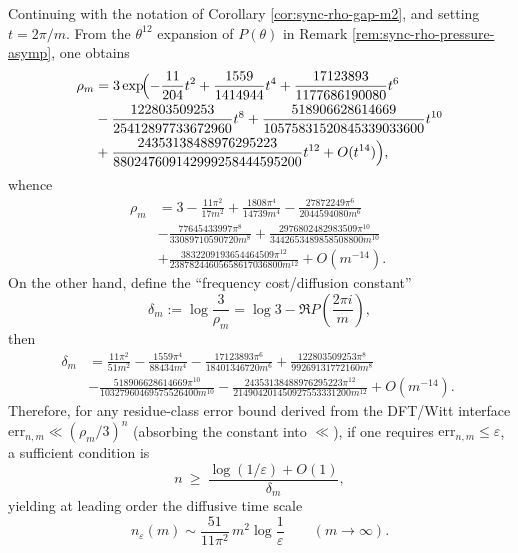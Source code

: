 \begin{corollary}\label{cor:sync-rho-gap-m8-diffusive}
Continuing with the notation of Corollary \ref{cor:sync-rho-gap-m2}, and setting \(t=2\pi/m\).
From the \(\theta^{12}\) expansion of \(P(\theta)\) in Remark \ref{rem:sync-rho-pressure-asymp}, one obtains
\[
\begin{aligned}
\rho_m
&=3\exp\!\Bigl(-\frac{11}{204}t^2+\frac{1559}{1414944}t^4+\frac{17123893}{1177686190080}t^6\\
&-\frac{122803509253}{25412897733672960}t^8+\frac{518906628614669}{10575831520845339033600}t^{10}\\
&+\frac{24353138488976295223}{880247609142999258444595200}t^{12}+O(t^{14})\Bigr),
\end{aligned}
\]
whence
\[
\boxed{\;
\begin{aligned}
\rho_m
&=3-\frac{11\pi^2}{17m^2}
+\frac{1808\pi^4}{14739m^4}
-\frac{27872249\pi^6}{2044594080m^6}\\
&-\frac{77645433997\pi^8}{33089710590720m^8}
+\frac{2976802482983509\pi^{10}}{3442653489858508800m^{10}}\\
&+\frac{3832209193654464509\pi^{12}}{23878244605658617036800m^{12}}
+O(m^{-14}).\;
\end{aligned}\;}
\]
On the other hand, define the ``frequency cost/diffusion constant''
\[
\delta_m:=\log\frac{3}{\rho_m}=\log 3-\Re P\!\left(\frac{2\pi i}{m}\right),
\]
then
\[
\boxed{\;
\begin{aligned}
\delta_m
&=\frac{11\pi^2}{51m^2}
-\frac{1559\pi^4}{88434m^4}
-\frac{17123893\pi^6}{18401346720m^6}
+\frac{122803509253\pi^8}{99269131772160m^8}\\
&-\frac{518906628614669\pi^{10}}{10327960469575526400m^{10}}
-\frac{24353138488976295223\pi^{12}}{214904201450927553331200m^{12}}
+O(m^{-14}).\;
\end{aligned}\;}
\]
Therefore, for any residue-class error bound derived from the DFT/Witt interface
\(
\mathrm{err}_{n,m}\ll (\rho_m/3)^n
\)
(absorbing the constant into \(\ll\)), if one requires \(\mathrm{err}_{n,m}\le \varepsilon\), a sufficient condition is
\[
n\ \ge\ \frac{\log(1/\varepsilon)+O(1)}{\delta_m},
\]
yielding at leading order the diffusive time scale
\[
\boxed{\;
n_\varepsilon(m)\sim \frac{51}{11\pi^2}\,m^2\log\frac{1}{\varepsilon}\qquad(m\to\infty).\;}
\]
\end{corollary}

